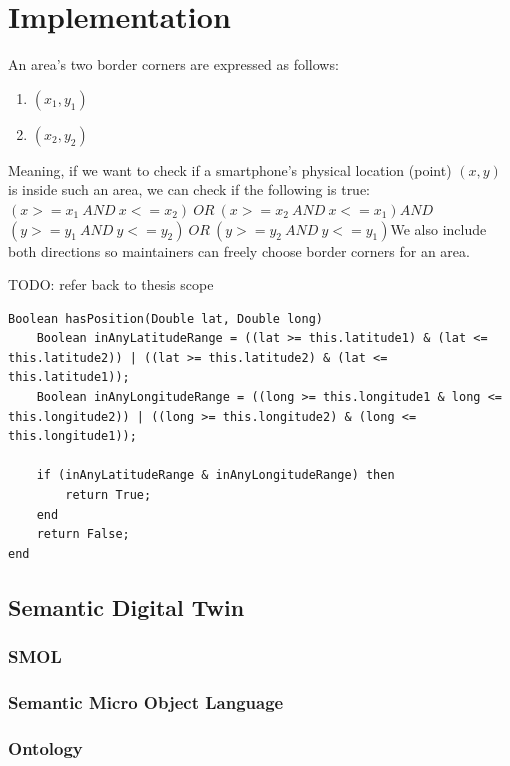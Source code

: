 \documentclass{article}
\begin{document}
\newpage
\section{Implementation}\label{sec:Implementation}

An area's two border corners are expressed as follows:
\begin{enumerate}
    \item $(x_1, y_1)$
    \item $(x_2, y_2)$
\end{enumerate}
Meaning, if we want to check if a smartphone's physical location (point) $(x, y)$ is inside such an area, we can check if the following is true:\newline\newline$(x >= x_1\:AND\: x <= x_2)\:OR\:(x >= x_2\:AND\:x <= x_1)$\newline$AND$\newline$(y >= y_1\:AND\:y <= y_2)\:OR\:(y >= y_2\:AND\:y <= y_1)$\newline We also include both directions so maintainers can freely choose border corners for an area. 

TODO: refer back to thesis scope
\begin{lstlisting}
Boolean hasPosition(Double lat, Double long)
    Boolean inAnyLatitudeRange = ((lat >= this.latitude1) & (lat <= this.latitude2)) | ((lat >= this.latitude2) & (lat <= this.latitude1));
    Boolean inAnyLongitudeRange = ((long >= this.longitude1 & long <= this.longitude2)) | ((long >= this.longitude2) & (long <= this.longitude1));

    if (inAnyLatitudeRange & inAnyLongitudeRange) then
        return True;
    end
    return False;
end
\end{lstlisting}


\subsection{Semantic Digital Twin}
\subsubsection{SMOL}
\subsubsection{Semantic Micro Object Language}
\subsubsection{Ontology}
\end{document}
